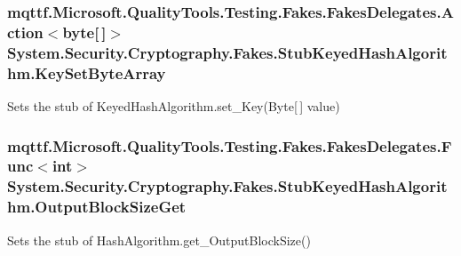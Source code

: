 \hypertarget{class_system_1_1_security_1_1_cryptography_1_1_fakes_1_1_stub_keyed_hash_algorithm_a0544b16938d5f7d61589fe183bdb2d80}{
\subsubsection[{Key\-Set\-Byte\-Array}]{\setlength{\rightskip}{0pt plus 5cm}mqttf.\-Microsoft.\-Quality\-Tools.\-Testing.\-Fakes.\-Fakes\-Delegates.\-Action$<$byte\mbox{[}$\,$\mbox{]}$>$ System.\-Security.\-Cryptography.\-Fakes.\-Stub\-Keyed\-Hash\-Algorithm.\-Key\-Set\-Byte\-Array}}\label{class_system_1_1_security_1_1_cryptography_1_1_fakes_1_1_stub_keyed_hash_algorithm_a0544b16938d5f7d61589fe183bdb2d80}


Sets the stub of Keyed\-Hash\-Algorithm.\-set\-\_\-\-Key(\-Byte\mbox{[}$\,$\mbox{]} value)

\hypertarget{class_system_1_1_security_1_1_cryptography_1_1_fakes_1_1_stub_keyed_hash_algorithm_a6aafcb6e00dea77de46c0b1fef0e3caa}{
\subsubsection[{Output\-Block\-Size\-Get}]{\setlength{\rightskip}{0pt plus 5cm}mqttf.\-Microsoft.\-Quality\-Tools.\-Testing.\-Fakes.\-Fakes\-Delegates.\-Func$<$int$>$ System.\-Security.\-Cryptography.\-Fakes.\-Stub\-Keyed\-Hash\-Algorithm.\-Output\-Block\-Size\-Get}}\label{class_system_1_1_security_1_1_cryptography_1_1_fakes_1_1_stub_keyed_hash_algorithm_a6aafcb6e00dea77de46c0b1fef0e3caa}


Sets the stub of Hash\-Algorithm.\-get\-\_\-\-Output\-Block\-Size()



